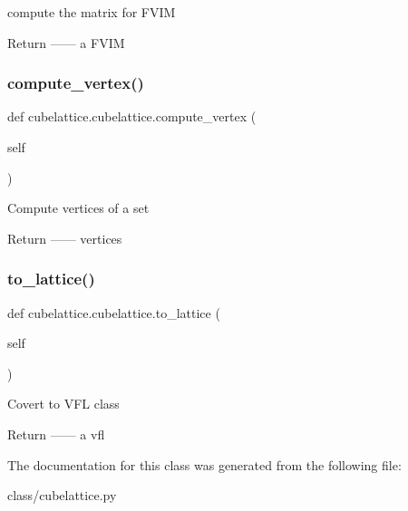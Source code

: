 \begin{DoxyVerb}compute the matrix for FVIM

Return
------
a FVIM
\end{DoxyVerb}
 \mbox{\label{classcubelattice_1_1cubelattice_aa93e98a034eb32f37711c461bfd5d7d5}} 
\subsubsection{\texorpdfstring{compute\+\_\+vertex()}{compute\_vertex()}}
{\footnotesize\ttfamily def cubelattice.\+cubelattice.\+compute\+\_\+vertex (\begin{DoxyParamCaption}\item[{}]{self }\end{DoxyParamCaption})}

\begin{DoxyVerb}Compute vertices of a set

Return
------
vertices 
\end{DoxyVerb}
 \mbox{\label{classcubelattice_1_1cubelattice_af29b5923e02e375b796f4d175348473f}} 
\subsubsection{\texorpdfstring{to\+\_\+lattice()}{to\_lattice()}}
{\footnotesize\ttfamily def cubelattice.\+cubelattice.\+to\+\_\+lattice (\begin{DoxyParamCaption}\item[{}]{self }\end{DoxyParamCaption})}

\begin{DoxyVerb}Covert to VFL class

Return
------
a vfl
\end{DoxyVerb}
 

The documentation for this class was generated from the following file\+:\begin{DoxyCompactItemize}
\item 
class/cubelattice.\+py\end{DoxyCompactItemize}
